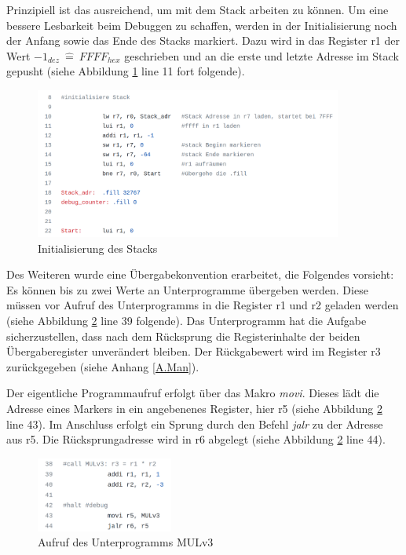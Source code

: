 \documentclass[fleqn, a4paper, 11pt]{article}       %
\begin{document}
Prinzipiell ist das ausreichend, um mit dem Stack arbeiten zu können. Um eine bessere Lesbarkeit beim Debuggen zu schaffen, werden in der Initialisierung noch der Anfang sowie das Ende des Stacks markiert. Dazu wird in das Register r1 der Wert $-1_{dez}\ \widehat{=}\ FFFF_{hex}$ geschrieben und an die erste und letzte Adresse im Stack gepusht (siehe Abbildung \ref{fig:Stack} line 11 fort folgende).

\begin{figure}[h]
    \includegraphics[width =0.9\textwidth]{Stack_init.png}
\caption{Initialisierung des Stacks}
\label{fig:Stack}
\end{figure}

\newpage
\noindent Des Weiteren wurde eine Übergabekonvention erarbeitet, die Folgendes vorsieht: Es können bis zu zwei Werte an Unterprogramme übergeben werden. Diese müssen vor Aufruf des Unterprogramms in die Register r1 und r2 geladen werden (siehe Abbildung \ref{fig:FKT} line 39 folgende). Das Unterprogramm hat die Aufgabe sicherzustellen, dass nach dem Rücksprung die Registerinhalte der beiden Übergaberegister unverändert bleiben. Der Rückgabewert wird im Register r3 zurückgegeben (siehe Anhang \ref{A.Man}).

Der eigentliche Programmaufruf erfolgt über das Makro \emph{movi}. Dieses lädt die Adresse eines Markers in ein angebenenes Register, hier r5 (siehe Abbildung \ref{fig:FKT} line 43). Im Anschluss erfolgt ein Sprung durch den Befehl \emph{jalr} zu der Adresse aus r5. Die Rücksprungadresse wird in r6 abgelegt (siehe Abbildung \ref{fig:FKT} line 44).

\begin{figure}[h]
    \includegraphics[width =0.4\textwidth]{Funktionsaufruf.png}
\caption{Aufruf des Unterprogramms MULv3}
\label{fig:FKT}
\end{figure}
\end{document}
